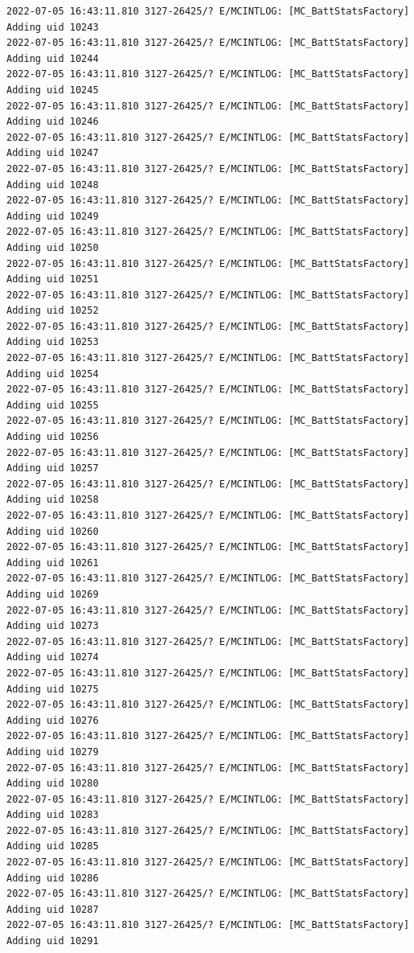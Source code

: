 \documentclass[a4paper,12pt]{book}
\begin{document}
\begin{lstlisting}
2022-07-05 16:43:11.810 3127-26425/? E/MCINTLOG: [MC_BattStatsFactory] Adding uid 10243
2022-07-05 16:43:11.810 3127-26425/? E/MCINTLOG: [MC_BattStatsFactory] Adding uid 10244
2022-07-05 16:43:11.810 3127-26425/? E/MCINTLOG: [MC_BattStatsFactory] Adding uid 10245
2022-07-05 16:43:11.810 3127-26425/? E/MCINTLOG: [MC_BattStatsFactory] Adding uid 10246
2022-07-05 16:43:11.810 3127-26425/? E/MCINTLOG: [MC_BattStatsFactory] Adding uid 10247
2022-07-05 16:43:11.810 3127-26425/? E/MCINTLOG: [MC_BattStatsFactory] Adding uid 10248
2022-07-05 16:43:11.810 3127-26425/? E/MCINTLOG: [MC_BattStatsFactory] Adding uid 10249
2022-07-05 16:43:11.810 3127-26425/? E/MCINTLOG: [MC_BattStatsFactory] Adding uid 10250
2022-07-05 16:43:11.810 3127-26425/? E/MCINTLOG: [MC_BattStatsFactory] Adding uid 10251
2022-07-05 16:43:11.810 3127-26425/? E/MCINTLOG: [MC_BattStatsFactory] Adding uid 10252
2022-07-05 16:43:11.810 3127-26425/? E/MCINTLOG: [MC_BattStatsFactory] Adding uid 10253
2022-07-05 16:43:11.810 3127-26425/? E/MCINTLOG: [MC_BattStatsFactory] Adding uid 10254
2022-07-05 16:43:11.810 3127-26425/? E/MCINTLOG: [MC_BattStatsFactory] Adding uid 10255
2022-07-05 16:43:11.810 3127-26425/? E/MCINTLOG: [MC_BattStatsFactory] Adding uid 10256
2022-07-05 16:43:11.810 3127-26425/? E/MCINTLOG: [MC_BattStatsFactory] Adding uid 10257
2022-07-05 16:43:11.810 3127-26425/? E/MCINTLOG: [MC_BattStatsFactory] Adding uid 10258
2022-07-05 16:43:11.810 3127-26425/? E/MCINTLOG: [MC_BattStatsFactory] Adding uid 10260
2022-07-05 16:43:11.810 3127-26425/? E/MCINTLOG: [MC_BattStatsFactory] Adding uid 10261
2022-07-05 16:43:11.810 3127-26425/? E/MCINTLOG: [MC_BattStatsFactory] Adding uid 10269
2022-07-05 16:43:11.810 3127-26425/? E/MCINTLOG: [MC_BattStatsFactory] Adding uid 10273
2022-07-05 16:43:11.810 3127-26425/? E/MCINTLOG: [MC_BattStatsFactory] Adding uid 10274
2022-07-05 16:43:11.810 3127-26425/? E/MCINTLOG: [MC_BattStatsFactory] Adding uid 10275
2022-07-05 16:43:11.810 3127-26425/? E/MCINTLOG: [MC_BattStatsFactory] Adding uid 10276
2022-07-05 16:43:11.810 3127-26425/? E/MCINTLOG: [MC_BattStatsFactory] Adding uid 10279
2022-07-05 16:43:11.810 3127-26425/? E/MCINTLOG: [MC_BattStatsFactory] Adding uid 10280
2022-07-05 16:43:11.810 3127-26425/? E/MCINTLOG: [MC_BattStatsFactory] Adding uid 10283
2022-07-05 16:43:11.810 3127-26425/? E/MCINTLOG: [MC_BattStatsFactory] Adding uid 10285
2022-07-05 16:43:11.810 3127-26425/? E/MCINTLOG: [MC_BattStatsFactory] Adding uid 10286
2022-07-05 16:43:11.810 3127-26425/? E/MCINTLOG: [MC_BattStatsFactory] Adding uid 10287
2022-07-05 16:43:11.810 3127-26425/? E/MCINTLOG: [MC_BattStatsFactory] Adding uid 10291

\end{lstlisting}
\end{document}
